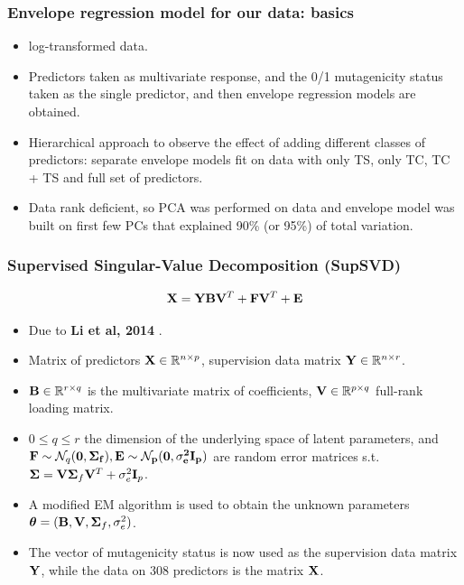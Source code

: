 \documentclass[handout,10pt]{beamer}
\newcommand{\colubf}{\color{UniBlue} \bf}
\begin{document}
\begin{frame}
\frametitle{Envelope regression model for our data: basics}
\begin{itemize}
\item log-transformed data.
\vspace{.2cm}
\item Predictors taken as multivariate response, and the 0/1 mutagenicity status taken as the single predictor, and then envelope regression models are obtained.
\vspace{.2cm}
\item Hierarchical approach to observe the effect of adding different classes of predictors: separate envelope models fit on data with only TS, only TC, TC + TS and full set of predictors.
\vspace{.2cm}
\item Data rank deficient, so PCA was performed on data and envelope model was built on first few PCs that explained 90\% (or 95\%) of total variation.
\end{itemize}
\end{frame}

\begin{frame}
\frametitle{Supervised Singular-Value Decomposition (SupSVD)}
$$ {\mathbf{X}} = {\mathbf{Y}}{\mathbf{B}}{\mathbf{V}}^T + {\mathbf{F}}{\mathbf{V}}^T + {\mathbf{E}} $$
\begin{itemize}
\item Due to {\colubf Li et al, 2014} \cite{supsvd}.
\vspace{.2cm}
\item  Matrix of predictors ${\mathbf{X}}\in{\mathbb{R}}^{n\times p}$, supervision data matrix ${\mathbf{Y}}\in{\mathbb{R}}^{n\times r}$.
\vspace{.2cm}
\item ${\mathbf{B}}\in\mathbb{R}^{r\times q}$ is the multivariate matrix of coefficients, ${\mathbf{V}}\in\mathbb{R}^{p\times q}$ full-rank loading matrix.
\vspace{.2cm}
\item $0\leq q\leq r$ the dimension of the underlying space of latent parameters, and ${\mathbf{F}}\sim\mathcal{N}_q(\bf0,{\boldsymbol{\Sigma}}_f), {\mathbf{E}}\sim\mathcal{N}_p(\bf0,\sigma_e^2{\mathbf{I}}_p)$ are random error matrices s.t. ${\boldsymbol{\Sigma}} = {\mathbf{V}}{\boldsymbol{\Sigma}}_f{\mathbf{V}}^T + \sigma_e^2{\mathbf{I}}_p$.
\vspace{.2cm}
\item A modified EM algorithm is used to obtain the unknown parameters ${\boldsymbol{\theta}}=({\mathbf{B}},{\mathbf{V}},{\boldsymbol{\Sigma}}_f,\sigma_e^2)$.
\vspace{.2cm}
\item The vector of mutagenicity status is now used as the supervision data matrix ${\mathbf{Y}}$, while the data on 308 predictors is the matrix ${\mathbf{X}}$.
\end{itemize}
\end{frame}
\end{document}

